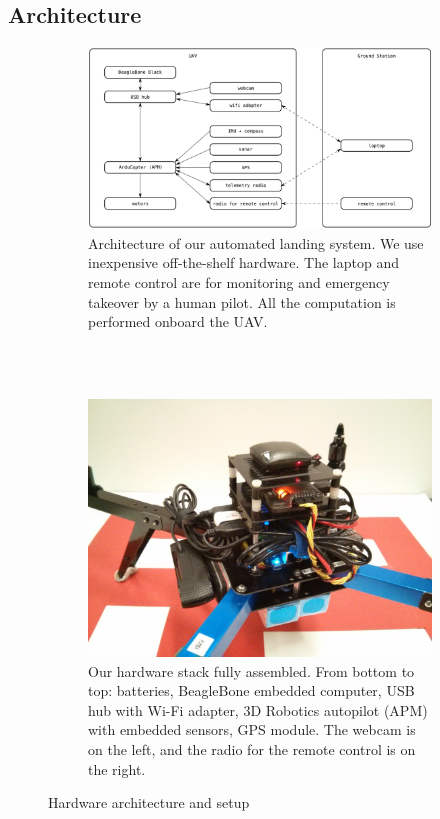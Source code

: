 \documentclass[10pt]{scrartcl} %
\begin{document}
\subsection{Architecture}

\begin{figure}[h!]
    \centering
    \begin{subfigure}[b]{0.9\textwidth}
        \includegraphics[width=\textwidth]{images/architecture.png}
        \caption{
            Architecture of our automated landing system. We use inexpensive
            off-the-shelf hardware. The laptop and remote control are for
            monitoring and emergency takeover by a human pilot. All the
            computation is performed onboard the UAV.
        }
    \end{subfigure}
    \\~\\
    \begin{subfigure}[b]{0.9\textwidth}
        \includegraphics[width=\textwidth]{images/hardware.jpg}
        \caption{
            Our hardware stack fully assembled. From bottom to top: batteries,
            BeagleBone embedded computer, USB hub with Wi-Fi adapter, 3D
            Robotics autopilot (APM) with embedded sensors, GPS module. The
            webcam is on the left, and the radio for the remote control is on
            the right.
        }
    \end{subfigure}
    \caption{Hardware architecture and setup}
    \label{fig:hardware}
\end{figure}
\end{document}

